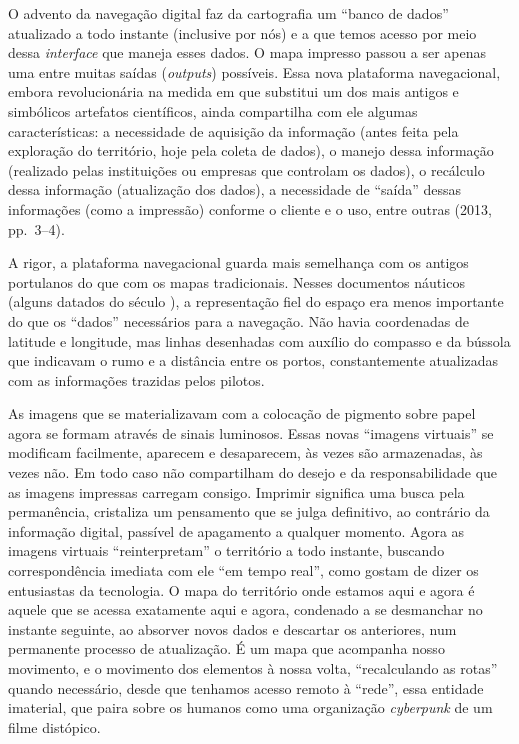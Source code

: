 O advento da navegação digital faz da cartografia um ``banco de dados''
atualizado a todo instante (inclusive por nós) e a que temos acesso por
meio dessa \emph{interface} que maneja esses dados. O mapa impresso
passou a ser apenas uma entre muitas saídas (\emph{outputs}) possíveis.
Essa nova plataforma navegacional, embora revolucionária na medida em
que substitui um dos mais antigos e simbólicos artefatos científicos,
ainda compartilha com ele algumas características: a necessidade de
aquisição da informação (antes feita pela exploração do território, hoje
pela coleta de dados), o manejo dessa informação (realizado pelas
instituições ou empresas que controlam os dados), o recálculo dessa
informação (atualização dos dados), a necessidade de ``saída'' dessas
informações (como a impressão) conforme o cliente e o uso, entre outras
(2013, pp.~3--4).

A rigor, a plataforma navegacional guarda mais semelhança com os antigos
portulanos do que com os mapas tradicionais. Nesses documentos náuticos
(alguns datados do século ), a representação fiel do espaço era
menos importante do que os ``dados'' necessários para a navegação. Não
havia coordenadas de latitude e longitude, mas linhas desenhadas com
auxílio do compasso e da bússola que indicavam o rumo e a distância
entre os portos, constantemente atualizadas com as informações trazidas
pelos pilotos.

As imagens que se materializavam com a colocação de pigmento sobre papel
agora se formam através de sinais luminosos. Essas novas ``imagens
virtuais'' se modificam facilmente, aparecem e desaparecem, às vezes são
armazenadas, às vezes não. Em todo caso não compartilham do desejo e da
responsabilidade que as imagens impressas carregam consigo. Imprimir
significa uma busca pela permanência, cristaliza um pensamento que se
julga definitivo, ao contrário da informação digital, passível de
apagamento a qualquer momento. Agora as imagens virtuais
``reinterpretam'' o território a todo instante, buscando correspondência
imediata com ele ``em tempo real'', como gostam de dizer os entusiastas
da tecnologia. O mapa do território onde estamos aqui e agora é aquele
que se acessa exatamente aqui e agora, condenado a se desmanchar no
instante seguinte, ao absorver novos dados e descartar os anteriores,
num permanente processo de atualização. É um mapa que acompanha nosso
movimento, e o movimento dos elementos à nossa volta, ``recalculando as
rotas'' quando necessário, desde que tenhamos acesso remoto à ``rede'',
essa entidade imaterial, que paira sobre os humanos como uma organização
\emph{cyberpunk} de um filme distópico.

